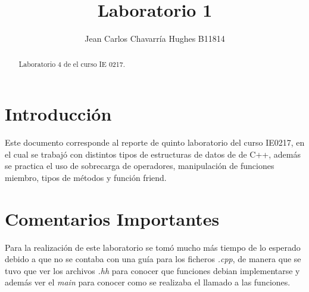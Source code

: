 \documentclass{article}
\begin{document}
\title{Laboratorio 1}
\author{Jean Carlos Chavarr\' ia Hughes B11814}
\maketitle
\begin{abstract}
Laboratorio 4 de el curso IE 0217.
\end{abstract}
\section{Introducci\' on}
Este documento corresponde al reporte de quinto laboratorio del curso IE0217, en el cual se trabaj\' o con distintos tipos de estructuras de datos de de C++, adem\' as se practica el uso de sobrecarga de operadores, manipulaci\' on de funciones miembro, tipos de m\' etodos y funci\' on friend.

\section{Comentarios Importantes}
Para la realizaci\' on de este laboratorio se tom\' o mucho m\' as tiempo de lo esperado debido a que no se contaba con una gu\' ia para los ficheros \textit{.cpp}, de manera que se tuvo que ver los archivos \textit{.hh} para conocer que funciones debian implementarse y adem\' as ver el \textit{main} para conocer como se realizaba el llamado a las funciones.
\end{document}
